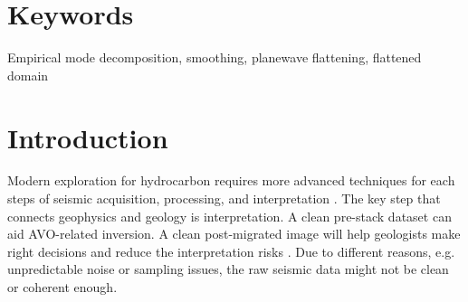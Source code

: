 \begin{abstract}
Due to different reasons, the seismic reflections are not continuous even when no faults or  discontinuities exist. We propose a novel approach for enhancing the amplitude of seismic reflections and mak  seismic reflections continuous. We use plane\new{-}wave flattening  to provide  horizontal events for the following empirical mode decomposition (EMD) based smoothing in the flattened domain.  inverse plane\new{-}wave flattening can be used to obtain original curved events. The plane\new{-}wave flattening process requires a precise local slope estimation, which  provided by the plane-wave destruction (PWD) algorithm. The EMD based smoothing filter is a non-parametric and adaptive filter, thus can be conveniently used. Both pre-stack and post-stack field data examples show tremendous improvement for the data quality, which  .  
\end{abstract}

\section{Keywords}
Empirical mode decomposition, smoothing, plane\new{-}wave flattening, flattened domain

\section{Introduction}
Modern exploration for hydrocarbon requires more advanced techniques for each steps of seismic acquisition, processing, and interpretation \cite[]{yangkang20142,qushan2015}. The key step that connects geophysics and geology is interpretation. A clean pre-stack dataset can aid AVO-related inversion. A clean post-migrated image will help geologists make right decisions and reduce the interpretation risks \cite[]{yangkang20141,zhiguang2014,yangkang2015image,wencheng2015stack}. Due to different reasons, e.g. unpredictable noise or sampling issues, the raw seismic data might not be clean or coherent enough. 

